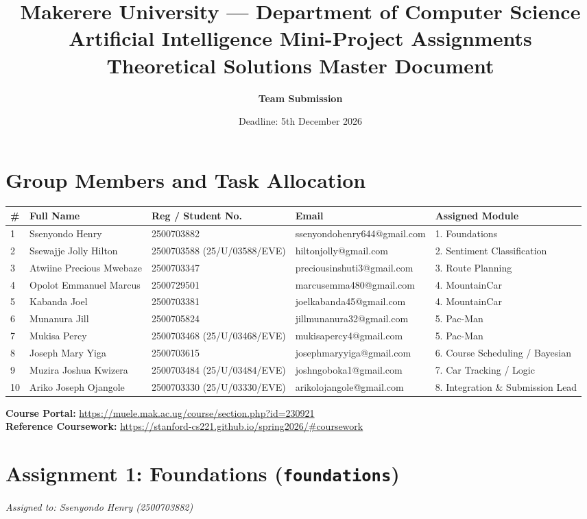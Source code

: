 \documentclass[11pt,a4paper]{article}
\title{\textbf{Makerere University --- Department of Computer Science}\\
\Large Artificial Intelligence Mini-Project Assignments\\
\large Theoretical Solutions Master Document}
\author{\textbf{Team Submission}}
\date{Deadline: 5th December 2026}
\begin{document}
\maketitle

\section*{Group Members and Task Allocation}
\begin{table}[h!]
\centering
\small
\begin{tabular}{@{}lllll@{}}
\toprule
\textbf{\#} & \textbf{Full Name} & \textbf{Reg / Student No.} & \textbf{Email} & \textbf{Assigned Module} \\ \midrule
1 & Ssenyondo Henry & 2500703882 & ssenyondohenry644@gmail.com & 1. Foundations \\
2 & Ssewajje Jolly Hilton & 2500703588 (25/U/03588/EVE) & hiltonjolly@gmail.com & 2. Sentiment Classification \\
3 & Atwiine Precious Mwebaze & 2500703347 & preciousinshuti3@gmail.com & 3. Route Planning \\
4 & Opolot Emmanuel Marcus & 2500729501 & marcusemma480@gmail.com & 4. MountainCar \\
5 & Kabanda Joel & 2500703381 & joelkabanda45@gmail.com & 4. MountainCar \\
6 & Munanura Jill & 2500705824 & jillmunanura32@gmail.com & 5. Pac-Man \\
7 & Mukisa Percy & 2500703468 (25/U/03468/EVE) & mukisapercy4@gmail.com & 5. Pac-Man \\
8 & Joseph Mary Yiga & 2500703615 & josephmaryyiga@gmail.com & 6. Course Scheduling / Bayesian \\
9 & Muzira Joshua Kwizera & 2500703484 (25/U/03484/EVE) & joshngoboka1@gmail.com & 7. Car Tracking / Logic \\
10 & Ariko Joseph Ojangole & 2500703330 (25/U/03330/EVE) & arikolojangole@gmail.com & 8. Integration \& Submission Lead \\ \bottomrule
\end{tabular}
\end{table}

\noindent\textbf{Course Portal:} \url{https://muele.mak.ac.ug/course/section.php?id=230921}\\
\textbf{Reference Coursework:} \url{https://stanford-cs221.github.io/spring2026/#coursework}

\newpage
\tableofcontents
\newpage

\section{Assignment 1: Foundations (\texttt{foundations})}
\textit{Assigned to: Ssenyondo Henry (2500703882)}
\end{document}
